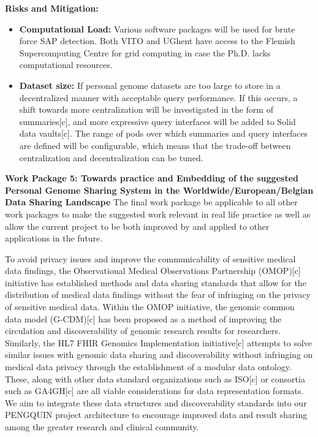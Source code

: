 \documentclass[11pt]{article}
\begin{document}
\textbf{Risks and Mitigation:} 
\begin{itemize}
	\item \textbf{Computational Load:} Various software packages will be used for brute force SAP detection. 
	Both VITO and UGhent have access to the Flemish Supercomputing Centre for grid computing in case the Ph.D. lacks computational resources. 
	\item \textbf{Dataset size:} If personal genome datasets are too large to store in a decentralized manner with acceptable query performance. 
	If this occurs, a shift towards more centralization will be investigated in the form of summaries[c], and more expressive query interfaces will be added to Solid data vaults[c]. 
	The range of pods over which summaries and query interfaces are defined will be configurable, which means that the trade-off between centralization and decentralization can be tuned.
\end{itemize}


\textbf{Work Package 5: Towards practice and Embedding of the suggested Personal Genome Sharing System in the Worldwide/European/Belgian Data Sharing Landscape}
The final work package be applicable to all other work packages to make the suggested work relevant in real life practice as well as allow the current project to be both improved by and applied to other applications in the future.

To avoid privacy issues and improve the communicability of sensitive medical data findings, the Observational Medical Observations Partnership (OMOP)[c] initiative has established methods and data sharing standards that allow for the distribution of medical data findings without the fear of infringing on the privacy of sensitive medical data. 
Within the OMOP initiative, the genomic common data model (G-CDM)[c] has been proposed as a method of improving the circulation and discoverability of genomic research results for researchers. 
Similarly, the HL7 FHIR Genomics Implementation initiative[c] attempts to solve similar issues with genomic data sharing and discoverability without infringing on medical data privacy through the establishment of a modular data ontology. 
These, along with other data standard organizations such as ISO[c] or consortia such as GA4GH[c] are all viable considerations for data representation formats. 
We aim to integrate these data structures and discoverability standards into our PENGQUIN project architecture to encourage improved data and result sharing among the greater research and clinical community. 
\end{document}
